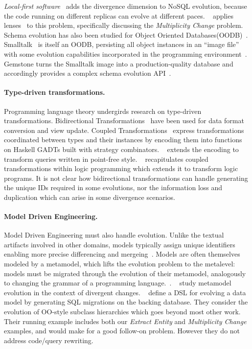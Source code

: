 \documentclass[english,crc]{programming}
\newcommand{\citet}[1]{\citeauthor*{#1}~\cite{#1}}
\begin{document}
\emph{Local-first software}~\cite{localfirst} adds the divergence dimension to NoSQL evolution, because the code running on different replicas can evolve at different paces. \citet{Cambria} applies lenses~\cite{Foster2007} to this problem, specifically discussing the \emph{Multiplicity Change} problem.
%
Schema evolution has also been studied for Object Oriented Databases(OODB)~\cite{li99,banerjee87}. Smalltalk~\cite{Goldberg80} is itself an OODB, persisting all object instances in an ``image file'' with some evolution capabilities incorporated in the programming environment~\cite[pp.252-272]{Goldberg80}. Gemstone turns the Smalltalk image into a production-quality database and accordingly provides a complex schema evolution API~\cite{Gemstone}.

\paragraph{Type-driven transformations.}
Programming language theory undergirds research on type-driven transformations. Bidirectional Transformations~\cite{czarnecki2009bidirectional} have been used for data format conversion and view update.
Coupled Transformations~\cite{Berdaguer07, alcino06, Cleve2006} express transformations coordinated between types and their instances by encoding them into functions on Haskell GADTs built with strategy combinators. \citet{JVisser08} extends the encoding to transform queries written in point-free style. \citet{lammel16} recapitulates coupled transformations within logic programming which extends it to transform logic programs. It is not clear how bidirectional transformations can handle generating the unique IDs required in some evolutions, nor the information loss and duplication which can arise in some divergence scenarios.

\paragraph{Model Driven Engineering.}
Model Driven Engineering must also handle evolution. Unlike the textual artifacts involved in other domains, models typically assign unique identifiers enabling more precise differencing and mergeing~\cite{alanen2003}.
Models are often themselves modeled by a metamodel, which lifts the evolution problem to the metalevel: models must be migrated through the evolution of their metamodel, analogously to changing the grammar of a programming language.~\cite{Herrmannsdoerfer11}. \citet{Cicchetti11} study metamodel evolution in the context of divergent changes.
\citet{vermolen11} define a DSL for evolving a data model by generating SQL migrations on the backing database. They consider the evolution of OO-style subclass hierarchies which goes beyond most other work. Their running example includes both our \emph{Extract Entity} and \emph{Multiplicity Change} examples, and would make for a good follow-on problem. However they do not address code/query rewriting.
\end{document}
